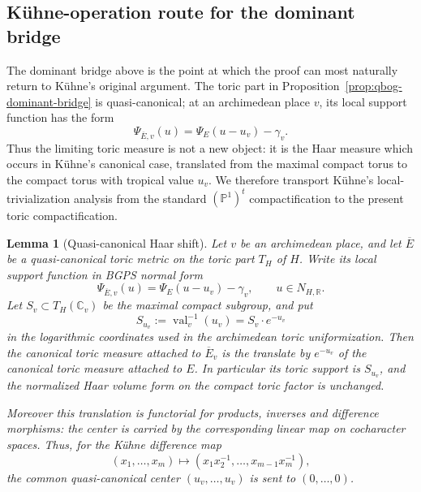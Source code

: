 \documentclass[10pt,a4paper]{amsart}
\theoremstyle{plain}
\newtheorem{lemma}[theorem]{Lemma}
\DeclareMathOperator{\val}{val}
\theoremstyle{plain}
\numberwithin{equation}{section}
\providecommand{\bE}{\overline{E}}
\begin{document}
\subsection{K\"uhne-operation route for the dominant bridge}

The dominant bridge above is the point at which the proof can most naturally
return to K\"uhne's original argument.  The toric part in
Proposition~\ref{prop:qbog-dominant-bridge} is quasi-canonical; at an archimedean
place \(v\), its local support function has the form
\[
\Psi_{\bE,v}(u)=\Psi_E(u-u_v)-\gamma_v .
\]
Thus the limiting toric measure is not a new object: it is the Haar measure
which occurs in K\"uhne's canonical case, translated from the maximal compact
torus to the compact torus with tropical value \(u_v\).  We therefore
transport K\"uhne's local-trivialization analysis
\cite[Lemma~3.3, Proposition~4.1, Lemmas~5.1--5.3, Proposition~6.1, Lemma~6.2,
and equation~(6.2)]{Ku1} from the standard \((\mathbb P^1)^t\)
compactification to the present toric compactification.

\begin{lemma}[Quasi-canonical Haar shift]
	\label{lem:qcanonical-haar-shift}
	Let \(v\) be an archimedean place, and let \(\bE\) be a quasi-canonical toric
	metric on the toric part \(T_H\) of \(H\).  Write its local support function in
	BGPS normal form
	\[
	\Psi_{\bE,v}(u)=\Psi_E(u-u_v)-\gamma_v,\qquad u\in N_{H,\mathbb R}.
	\]
	Let \(S_v\subset T_H(\mathbb C_v)\) be the maximal compact subgroup, and put
	\[
	S_{u_v}:=\val_v^{-1}(u_v)=S_v\cdot e^{-u_v}
	\]
	in the logarithmic coordinates used in the archimedean toric
	uniformization.  Then the canonical toric measure attached to
	\(\bE_v\) is the translate by \(e^{-u_v}\) of the canonical toric measure
	attached to \(E\).  In particular its toric support is \(S_{u_v}\), and the
	normalized Haar volume form on the compact toric factor is unchanged.
	
	Moreover this translation is functorial for products, inverses and difference
	morphisms: the center is carried by the corresponding linear map on
	cocharacter spaces.  Thus, for the K\"uhne difference map
	\[
	(x_1,\ldots,x_m)\longmapsto
	(x_1x_2^{-1},\ldots,x_{m-1}x_m^{-1}),
	\]
	the common quasi-canonical center \((u_v,\ldots,u_v)\) is sent to
	\((0,\ldots,0)\).
\end{lemma}
\end{document}

